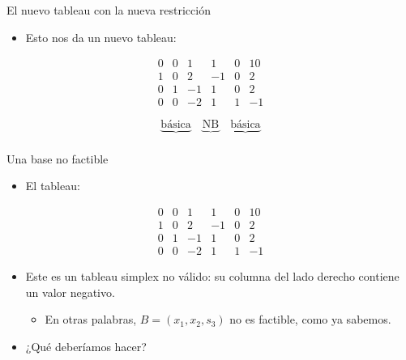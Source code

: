 \documentclass{beamer}
\begin{document}
\begin{frame}{El nuevo tableau con la nueva restricción}
    \begin{itemize}
        \item Esto nos da un nuevo tableau:
    \end{itemize}

    \[
    \begin{array}{ccccc|c}
        0 & 0 & 1 & 1 & 0 & 10 \\
        \hline
        1 & 0 & 2 & -1 & 0 & 2 \\
        0 & 1 & -1 & 1 & 0 & 2 \\
        0 & 0 & -2 & 1 & 1 & -1
    \end{array}
    \]

    \[
    \underbrace{\text{básica}}_{\phantom{a}} \quad \underbrace{\text{NB}} \quad \underbrace{\text{básica}}_{\phantom{a}}
    \]
\end{frame}

\begin{frame}{Una base no factible}
    \begin{itemize}
        \item El tableau:
    \end{itemize}

    \[
    \begin{array}{ccccc|c}
        0 & 0 & 1 & 1 & 0 & 10 \\
        \hline
        1 & 0 & 2 & -1 & 0 & 2 \\
        0 & 1 & -1 & 1 & 0 & 2 \\
        0 & 0 & -2 & 1 & 1 & -1
    \end{array}
    \]

    \begin{itemize}
        \item Este es un tableau simplex no válido: su columna del lado derecho contiene un valor negativo.
        \begin{itemize}
            \item En otras palabras, \( B = (x_1, x_2, s_3) \) no es factible, como ya sabemos.
        \end{itemize}

        \item ¿Qué deberíamos hacer?
    \end{itemize}
\end{frame}
\end{document}
